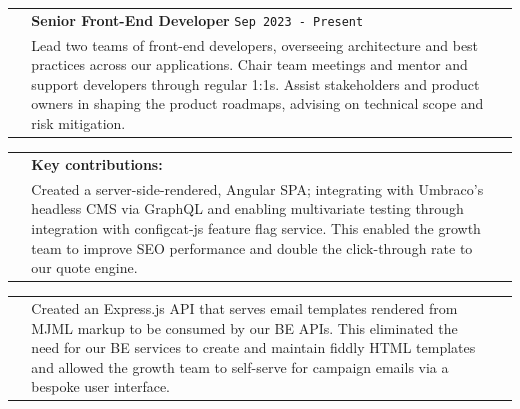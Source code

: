 \documentclass[letterpaper,11pt]{article}
\begin{document}
\begin{tabular*}{6.6in}{p{0.2in}p{6.3in}p{0in}}

  \, &
  { \textbf{\small Senior Front-End Developer}\cftdotfill{\cftdotsep} \texttt{\small Sep 2023 - Present}} &
   \, \\
  
  \, &
       {\small

       Lead two teams of front-end developers, overseeing architecture and best practices across our applications. Chair team meetings and mentor and support developers through regular 1:1s. Assist stakeholders and product owners in shaping the product roadmaps, advising on technical scope and risk mitigation.
       
       } &
   \, \\

\end{tabular*}

\vspace{-8pt}

\begin{tabular*}{6.6in}{p{0.2in}p{6.3in}p{0in}}
  
  \, &  
     { \textbf{\footnotesize Key contributions:}
     } &
   \, \\
  
 \, &
       {\small

      Created a server-side-rendered, Angular SPA; integrating with Umbraco's headless CMS via GraphQL and enabling multivariate testing through integration with configcat-js feature flag service. This enabled the growth team to improve SEO performance and double the click-through rate to our quote engine.
      
       } &
           \, \\
  
\end{tabular*}


\vspace{-12pt}

\begin{tabular*}{6.6in}{p{0.2in}p{6.3in}p{0in}}
  
  \, & {\small

       Created an Express.js API that serves email templates rendered from MJML markup to be consumed by our BE APIs. This eliminated the need for our BE services to create and maintain fiddly HTML templates and allowed the growth team to self-serve for campaign emails via a bespoke user interface.
   
       } &
      \, \\

\end{tabular*}
\end{document}
